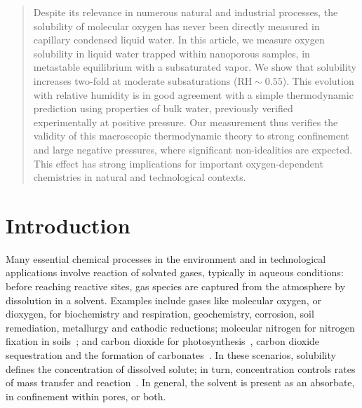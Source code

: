 \documentclass[aps,prl,twocolumn,superscriptaddress,groupedaddress]{revtex4}
\begin{document}
\begin{abstract}
Despite its relevance in numerous natural and industrial processes, the solubility of molecular oxygen has never been directly measured in capillary condensed liquid water. In this article, we measure oxygen solubility in liquid water trapped within nanoporous samples, in metastable equilibrium with a subsaturated vapor. We show that solubility increases two-fold at moderate subsaturations ($\mathrm{RH} \sim 0.55$). This evolution with relative humidity is in good agreement with a simple thermodynamic prediction using properties of bulk water, previously verified experimentally at positive pressure. Our measurement thus verifies the validity of this macroscopic thermodynamic theory to strong confinement and large negative pressures, where significant non-idealities are expected. This effect has strong implications for important oxygen-dependent chemistries in natural and technological contexts.
\end{abstract}

\maketitle

\section{Introduction}

Many essential chemical processes in the environment and in technological applications involve reaction of solvated gases, typically in aqueous conditions: before reaching reactive sites, gas species are captured from the atmosphere by dissolution in a solvent. Examples include gases like molecular oxygen, or dioxygen, for biochemistry and respiration\cite{ingraham}, geochemistry\cite{sigel_oxygen}, corrosion\cite{gleeson_1941,mcintire_1990}, soil remediation\cite{fry_1997}, metallurgy\cite{miller_1998,greenwood_oxygen} and cathodic reductions\cite{damjanovic_1992,girishkumar_2010}; molecular nitrogen for nitrogen fixation in soils~\cite{postgate}; and carbon dioxide for photosynthesis~\cite{rabinowitch}, carbon dioxide sequestration and the formation of carbonates~\cite{berner_1983,morse_2007b}. In these scenarios, solubility defines the concentration of dissolved solute; in turn, concentration controls rates of mass transfer and reaction~\cite{levich}. In general, the solvent is present as an absorbate, in confinement within pores, or both. 
\end{document}
